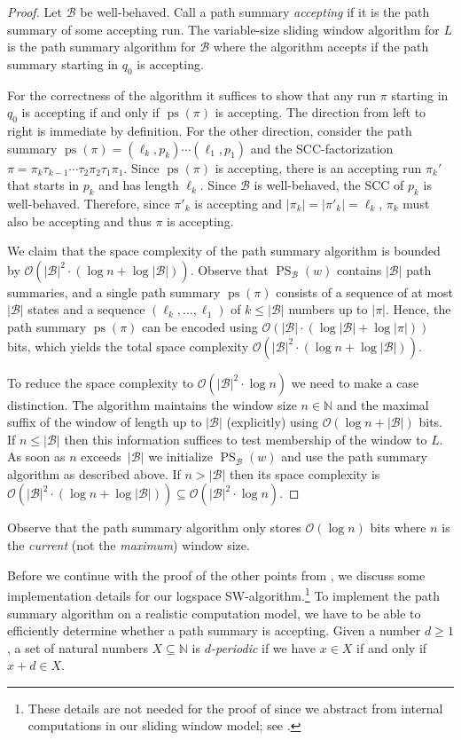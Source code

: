 \documentclass{article}\usepackage[a4paper,margin=20mm]{geometry}
\newcommand{\N}{\mathbb{N}}
\newcommand{\B}{\mathcal{B}}
\renewcommand{\O}{\mathcal{O}}
\DeclareMathOperator{\ps}{ps}
\DeclareMathOperator{\PS}{PS}
\renewcommand{\geq}{\geqslant}
\renewcommand{\leq}{\leqslant}
\renewcommand{\ge}{\geq}
\renewcommand{\le}{\leq}
\begin{document}
\begin{proof}
	Let $\B$ be well-behaved.
	Call a path summary {\em accepting} if it is the path summary of some accepting run.
	The variable-size sliding window algorithm for $L$ is the path summary algorithm for $\B$
	where the algorithm accepts if the path summary starting in $q_0$ is accepting.
	
	For the correctness of the algorithm it suffices to show that
	any run $\pi$ starting in $q_0$ is accepting
	if and only if $\ps(\pi)$ is accepting.
	The direction from left to right is immediate by definition.
	For the other direction, consider the path summary $\ps(\pi) = (\ell_k,p_k) \cdots (\ell_1,p_1)$
	and the SCC-factorization $\pi = \pi_k \tau_{k-1} \cdots \tau_2 \pi_2 \tau_1 \pi_1$.
	Since $\ps(\pi)$ is accepting, there is an accepting run $\pi_k'$
	that starts in $p_k$ and has length $\ell_k$.
	Since $\B$ is well-behaved, the SCC of $p_k$ is well-behaved.
	Therefore, since $\pi'_k$ is accepting and $|\pi_k|=|\pi'_k|=\ell_k$, $\pi_k$ must also be accepting and
	thus $\pi$ is accepting.
	
	We claim that the space complexity of the path summary algorithm is bounded by $\O(|\B|^2 \cdot (\log n + \log |\B|))$.
	Observe that $\PS_\B(w)$ contains $|\B|$ path summaries,
	and a single path summary $\ps(\pi)$ consists of a sequence of at most $|\B|$ states
	and a sequence $(\ell_k, \dots, \ell_1)$ of 
	$k \le |\B|$ numbers up to $|\pi|$.
	Hence, the path summary $\ps(\pi)$ can be encoded using $\O(|\B| \cdot (\log |\B| + \log |\pi|))$ bits, which yields the total
	space complexity $\O(|\B|^2 \cdot (\log n + \log |\B|))$.
	
	To reduce the space complexity to $\O(|\B|^2 \cdot \log n)$ we need to make a case distinction.
	The algorithm maintains the window size $n \in \N$ and the maximal suffix of the window of length up to $|\B|$
	(explicitly) using $\O(\log n + |\B|)$ bits.
	If $n \le |\B|$ then this information suffices to test membership of the window to $L$.
	As soon as $n$ exceeds~$|\B|$ we initialize $\PS_\B(w)$ and use the path summary algorithm
	as described above.
	If $n > |\B|$ then its space complexity is
	$\O(|\B|^2 \cdot (\log n + \log  |\B|)) \subseteq \O(|\B|^2 \cdot \log n)$.
\end{proof}

Observe that the path summary algorithm only stores $\O(\log n)$ bits
where $n$ is the \emph{current} (not the \emph{maximum}) window size.

Before we continue with the proof of the other points from , 
we discuss some implementation details for our logspace SW-algorithm.\footnote{These details are not needed for the proof of 
since we abstract from internal computations in our sliding window model; see .}
To implement the path summary algorithm on a realistic computation model,
we have to be able to efficiently determine whether a path summary is accepting.
Given a number $d \ge 1$,
a set of natural numbers $X \subseteq \N$ is {\em $d$-periodic}
if we have $x \in X$ if and only if $x + d \in X$.
\end{document}
